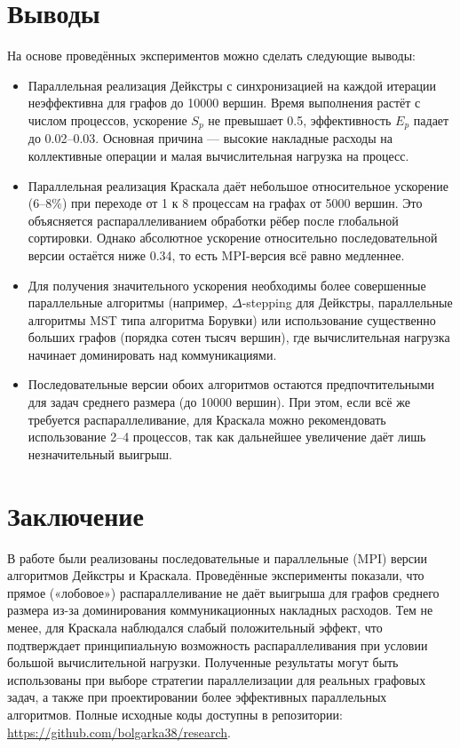 \documentclass[14pt,a4paper]{article}
\begin{document}
\section{Выводы}
На основе проведённых экспериментов можно сделать следующие выводы:
\begin{itemize}
    \item Параллельная реализация Дейкстры с синхронизацией на каждой итерации неэффективна для графов до 10000 вершин. Время выполнения растёт с числом процессов, ускорение $S_p$ не превышает 0.5, эффективность $E_p$ падает до 0.02–0.03. Основная причина — высокие накладные расходы на коллективные операции и малая вычислительная нагрузка на процесс.
    \item Параллельная реализация Краскала даёт небольшое относительное ускорение (6–8\%) при переходе от 1 к 8 процессам на графах от 5000 вершин. Это объясняется распараллеливанием обработки рёбер после глобальной сортировки. Однако абсолютное ускорение относительно последовательной версии остаётся ниже 0.34, то есть MPI-версия всё равно медленнее.
    \item Для получения значительного ускорения необходимы более совершенные параллельные алгоритмы (например, $\Delta$-stepping для Дейкстры, параллельные алгоритмы MST типа алгоритма Борувки) или использование существенно больших графов (порядка сотен тысяч вершин), где вычислительная нагрузка начинает доминировать над коммуникациями.
    \item Последовательные версии обоих алгоритмов остаются предпочтительными для задач среднего размера (до 10000 вершин). При этом, если всё же требуется распараллеливание, для Краскала можно рекомендовать использование 2–4 процессов, так как дальнейшее увеличение даёт лишь незначительный выигрыш.
\end{itemize}

\section{Заключение}
В работе были реализованы последовательные и параллельные (MPI) версии алгоритмов Дейкстры и Краскала. Проведённые эксперименты показали, что прямое («лобовое») распараллеливание не даёт выигрыша для графов среднего размера из-за доминирования коммуникационных накладных расходов. Тем не менее, для Краскала наблюдался слабый положительный эффект, что подтверждает принципиальную возможность распараллеливания при условии большой вычислительной нагрузки. Полученные результаты могут быть использованы при выборе стратегии параллелизации для реальных графовых задач, а также при проектировании более эффективных параллельных алгоритмов. Полные исходные коды доступны в репозитории: \url{https://github.com/bolgarka38/research}.
\end{document}
